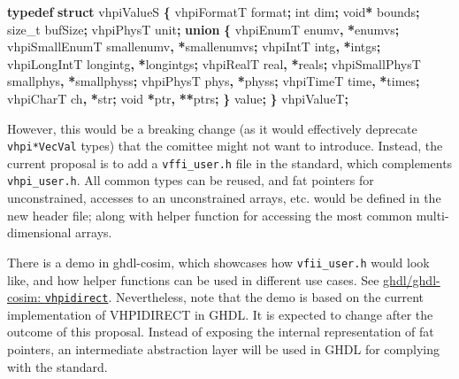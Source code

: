 \documentclass[
]{article}
\newenvironment{Shaded}{\begin{snugshade}}{\end{snugshade}}
\newcommand{\DataTypeTok}[1]{\textcolor[rgb]{0.13,0.29,0.53}{#1}}
\newcommand{\KeywordTok}[1]{\textcolor[rgb]{0.13,0.29,0.53}{\textbf{#1}}}
\newcommand{\NormalTok}[1]{#1}
\newcommand{\OperatorTok}[1]{\textcolor[rgb]{0.81,0.36,0.00}{\textbf{#1}}}
\begin{document}
\begin{Shaded}
\begin{Highlighting}[]
\KeywordTok{typedef} \KeywordTok{struct}\NormalTok{ vhpiValueS }\OperatorTok{\{}
\NormalTok{  vhpiFormatT format}\OperatorTok{;}
  \DataTypeTok{int}\NormalTok{ dim}\OperatorTok{;}
  \DataTypeTok{void}\OperatorTok{*}\NormalTok{ bounds}\OperatorTok{;}
  \DataTypeTok{size\_t}\NormalTok{ bufSize}\OperatorTok{;}
\NormalTok{  vhpiPhysT unit}\OperatorTok{;}
  \KeywordTok{union} \OperatorTok{\{}
\NormalTok{    vhpiEnumT      enumv}\OperatorTok{,}      \OperatorTok{*}\NormalTok{enumvs}\OperatorTok{;}
\NormalTok{    vhpiSmallEnumT smallenumv}\OperatorTok{,} \OperatorTok{*}\NormalTok{smallenumvs}\OperatorTok{;}
\NormalTok{    vhpiIntT       intg}\OperatorTok{,}       \OperatorTok{*}\NormalTok{intgs}\OperatorTok{;}
\NormalTok{    vhpiLongIntT   longintg}\OperatorTok{,}   \OperatorTok{*}\NormalTok{longintgs}\OperatorTok{;}
\NormalTok{    vhpiRealT      real}\OperatorTok{,}       \OperatorTok{*}\NormalTok{reals}\OperatorTok{;}
\NormalTok{    vhpiSmallPhysT smallphys}\OperatorTok{,}  \OperatorTok{*}\NormalTok{smallphyss}\OperatorTok{;}
\NormalTok{    vhpiPhysT      phys}\OperatorTok{,}       \OperatorTok{*}\NormalTok{physs}\OperatorTok{;}
\NormalTok{    vhpiTimeT      time}\OperatorTok{,}       \OperatorTok{*}\NormalTok{times}\OperatorTok{;}
\NormalTok{    vhpiCharT      ch}\OperatorTok{,}         \OperatorTok{*}\NormalTok{str}\OperatorTok{;}
    \DataTypeTok{void}           \OperatorTok{*}\NormalTok{ptr}\OperatorTok{,}       \OperatorTok{**}\NormalTok{ptrs}\OperatorTok{;}
  \OperatorTok{\}}\NormalTok{ value}\OperatorTok{;}
\OperatorTok{\}}\NormalTok{ vhpiValueT}\OperatorTok{;}
\end{Highlighting}
\end{Shaded}

However, this would be a breaking change (as it would effectively deprecate \texttt{vhpi*VecVal} types) that the comittee might not want to introduce. Instead, the current proposal is to add a \texttt{vffi\_user.h} file in the standard, which complements \texttt{vhpi\_user.h}. All common types can be reused, and fat pointers for unconstrained, accesses to an unconstrained arrays, etc. would be defined in the new header file; along with helper function for accessing the most common multi-dimensional arrays.

There is a demo in ghdl-cosim, which showcases how \texttt{vfii\_user.h} would look like, and how helper functions can be used in different use cases. See \href{https://github.com/ghdl/ghdl-cosim/blob/master/vhpidirect}{ghdl/ghdl-cosim: \texttt{vhpidirect}}. Nevertheless, note that the demo is based on the current implementation of VHPIDIRECT in GHDL. It is expected to change after the outcome of this proposal. Instead of exposing the internal representation of fat pointers, an intermediate abstraction layer will be used in GHDL for complying with the standard.
\end{document}
